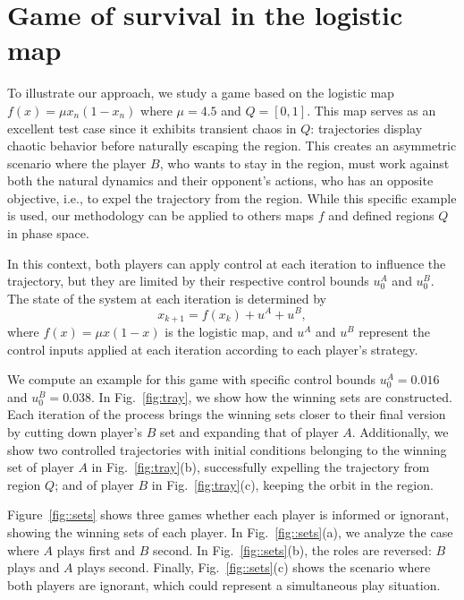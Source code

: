 


\section{Game of survival in the logistic map}



To illustrate our approach, we study a game based on the logistic map ${f(x) = \mu x_n(1-x_n)}$ where $\mu=4.5$ and $Q=[0,1]$. This map serves as an excellent test case since it exhibits transient chaos in $Q$: trajectories display chaotic behavior before naturally escaping the region. This creates an asymmetric scenario where the player $B$, who wants to stay in the region, must work against both the natural dynamics and their opponent's actions, who has an opposite objective, i.e., to expel the trajectory from the region. While this specific example is used, our methodology can be applied to others maps $f$ and defined regions $Q$ in phase space.

In this context, both players can apply control at each iteration to influence the trajectory, but they are limited by their respective control bounds $u_0^A$ and $u_0^B$. The state of the system at each iteration is determined by
\begin{equation}
x_{k+1} = f(x_k) + u^A + u^B,
\end{equation}
where $f(x) = \mu x(1-x)$ is the logistic map, and $u^A$ and $u^B$ represent the control inputs applied at each iteration according to each player's strategy.






We compute an example for this game with specific control bounds $u_0^A = 0.016$ and $u_0^B = 0.038$. In Fig.~\ref{fig:tray}, we show how the winning sets are constructed. Each iteration of the process brings the winning sets closer to their final version by cutting down player's $B$ set and expanding that of player $A$. Additionally, we show two controlled trajectories with initial conditions belonging to the winning set of player $A$ in Fig.~\ref{fig:tray}(b), successfully expelling the trajectory from region $Q$; and of player $B$ in Fig.~\ref{fig:tray}(c), keeping the orbit in the region. 

Figure~\ref{fig::sets} shows three games whether each player is informed or ignorant, showing the winning sets of each player. In Fig.~\ref{fig::sets}(a), we analyze the case where $A$ plays first and $B$ second. In Fig.~\ref{fig::sets}(b), the roles are reversed: $B$ plays and $A$ plays second. Finally, Fig.~\ref{fig::sets}(c) shows the scenario where both players are ignorant, which could represent a simultaneous play situation.

